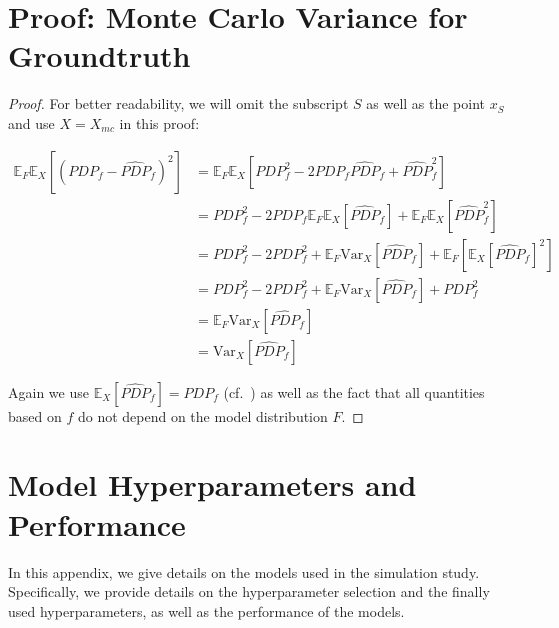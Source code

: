 \documentclass[runningheads]{llncs}
\begin{document}
\section{Proof: Monte Carlo Variance for Groundtruth}\label{app:proof-mc-variance}
\begin{proof}
    For better readability, we will omit the subscript $S$ as well as the point $x_S$ and use $X=X_{mc}$ in this proof:

    \begin{align*}
        \mathbb{E}_F\mathbb{E}_X[(PDP_f - \widehat{PDP}_f)^2] & = \mathbb{E}_F\mathbb{E}_X[PDP_f^2 - 2PDP_f \widehat{PDP}_f + \widehat{PDP}_f^2]                                 \\
                                                              & = PDP_f^2 - 2PDP_f \mathbb{E}_F\mathbb{E}_X[\widehat{PDP}_f] + \mathbb{E}_F\mathbb{E}_X[\widehat{PDP}_f^2]       \\
                                                              & = PDP_f^2 - 2PDP_f^2 + \mathbb{E}_F\text{Var}_X[\widehat{PDP}_f] + \mathbb{E}_F[\mathbb{E}_X[\widehat{PDP}_f]^2] \\
                                                              & = PDP_f^2 - 2PDP_f^2 + \mathbb{E}_F\text{Var}_X[\widehat{PDP}_f] + PDP_f^2                                       \\
                                                              & = \mathbb{E}_F\text{Var}_X[\widehat{PDP}_f]                                                                      \\
                                                              & = \text{Var}_X[\widehat{PDP}_f]
    \end{align*}

    \noindent Again we use $\mathbb{E}_X[\widehat{PDP}_{f}] = PDP_{f}$ (cf.~\cite{molnar_relating_2023}) as well as the fact
    that all quantities based on $f$ do not depend on the model distribution $F$.
\end{proof}

\section{Model Hyperparameters and Performance}\label{app:model-hps-perf}
In this appendix, we give details on the models used in the simulation study.
Specifically, we provide details on the hyperparameter selection and the
finally used hyperparameters, as well as the performance of the models.
\end{document}

